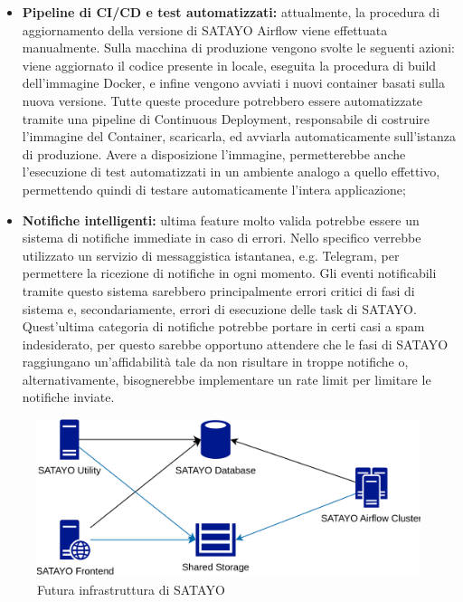 \begin{itemize}
  \item \textbf{Pipeline di CI/CD e test automatizzati:} attualmente, la procedura
    di aggiornamento della versione di SATAYO Airflow viene effettuata manualmente.
    Sulla macchina di produzione vengono svolte le seguenti azioni: viene aggiornato
    il codice presente in locale, eseguita la procedura di build dell'immagine
    Docker, e infine vengono avviati i nuovi container basati sulla nuova versione.
    Tutte queste procedure potrebbero essere automatizzate tramite una pipeline
    di Continuous Deployment, responsabile di costruire l'immagine del Container,
    scaricarla, ed avviarla automaticamente sull'istanza di produzione. Avere a
    disposizione l'immagine, permetterebbe anche l'esecuzione di test automatizzati
    in un ambiente analogo a quello effettivo, permettendo quindi di testare
    automaticamente l'intera applicazione;

  \item \textbf{Notifiche intelligenti:} ultima feature molto valida potrebbe
    essere un sistema di notifiche immediate in caso di errori. Nello specifico verrebbe
    utilizzato un servizio di messaggistica istantanea, e.g. Telegram, per
    permettere la ricezione di notifiche in ogni momento. Gli eventi notificabili
    tramite questo sistema sarebbero principalmente errori critici di fasi di sistema
    e, secondariamente, errori di esecuzione delle task di SATAYO. Quest'ultima
    categoria di notifiche potrebbe portare in certi casi a spam indesiderato, per
    questo sarebbe opportuno attendere che le fasi di SATAYO raggiungano un'affidabilità
    tale da non risultare in troppe notifiche o, alternativamente, bisognerebbe implementare
    un rate limit per limitare le notifiche inviate.
\end{itemize}

\begin{figure}[htbp]
  \centering
  \includegraphics[width=.6\linewidth]{images/SATAYO_infrastructure_future.png}
  \caption{Futura infrastruttura di SATAYO}
  \label{fig:infra_future}
\end{figure}